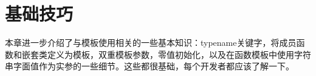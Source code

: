 \chapter{基础技巧}
本章进一步介绍了与模板使用相关的一些基本知识：typename关键字，将成员函数和嵌套类定义为模板，双重模板参数，零值初始化，以及在函数模板中使用字符串字面值作为实参的一些细节。这些都很基础，每个开发者都应该了解一下。







